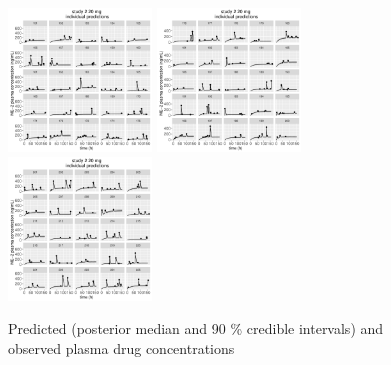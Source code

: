 \documentclass[11pt]{amsart}
\begin{document}
\begin{figure}[htbp]
\includegraphics[width=1.5in,trim=0in 0in 0 0in]{graphics/effCptModelTorsten/effCptModelTorstenPlots016.pdf}
\includegraphics[width=1.5in,trim=0in 0in 0 0in]{graphics/effCptModelTorsten/effCptModelTorstenPlots017.pdf}
\includegraphics[width=1.5in,trim=0in 0in 0 0in]{graphics/effCptModelTorsten/effCptModelTorstenPlots018.pdf}
\caption{{Predicted (posterior median and 90 \% credible intervals) and observed plasma drug concentrations}}
\label{predictions}
\end{figure}
\end{document}
